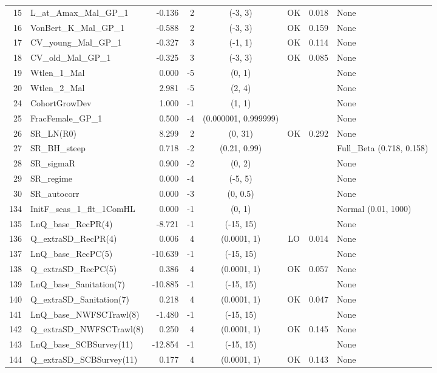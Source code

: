 \documentclass[12pt,]{article}
\begin{document}
\begin{landscape}
\begin{longtable}{rlrrcccl}
  15 & L\_at\_Amax\_Mal\_GP\_1 & -0.136 & 2 & (-3, 3) & OK & 0.018 & None \\ 
  16 & VonBert\_K\_Mal\_GP\_1 & -0.588 & 2 & (-3, 3) & OK & 0.159 & None \\ 
  17 & CV\_young\_Mal\_GP\_1 & -0.327 & 3 & (-1, 1) & OK & 0.114 & None \\ 
  18 & CV\_old\_Mal\_GP\_1 & -0.325 & 3 & (-3, 3) & OK & 0.085 & None \\ 
  19 & Wtlen\_1\_Mal & 0.000 & -5 & (0, 1) &  &  & None \\ 
  20 & Wtlen\_2\_Mal & 2.981 & -5 & (2, 4) &  &  & None \\ 
  24 & CohortGrowDev & 1.000 & -1 & (1, 1) &  &  & None \\ 
  25 & FracFemale\_GP\_1 & 0.500 & -4 & (0.000001, 0.999999) &  &  & None \\ 
  26 & SR\_LN(R0) & 8.299 & 2 & (0, 31) & OK & 0.292 & None \\ 
  27 & SR\_BH\_steep & 0.718 & -2 & (0.21, 0.99) &  &  & Full\_Beta (0.718, 0.158) \\ 
  28 & SR\_sigmaR & 0.900 & -2 & (0, 2) &  &  & None \\ 
  29 & SR\_regime & 0.000 & -4 & (-5, 5) &  &  & None \\ 
  30 & SR\_autocorr & 0.000 & -3 & (0, 0.5) &  &  & None \\ 
  134 & InitF\_seas\_1\_flt\_1ComHL & 0.000 & -1 & (0, 1) &  &  & Normal (0.01, 1000) \\ 
  135 & LnQ\_base\_RecPR(4) & -8.721 & -1 & (-15, 15) &  &  & None \\ 
  136 & Q\_extraSD\_RecPR(4) & 0.006 & 4 & (0.0001, 1) & LO & 0.014 & None \\ 
  137 & LnQ\_base\_RecPC(5) & -10.639 & -1 & (-15, 15) &  &  & None \\ 
  138 & Q\_extraSD\_RecPC(5) & 0.386 & 4 & (0.0001, 1) & OK & 0.057 & None \\ 
  139 & LnQ\_base\_Sanitation(7) & -10.885 & -1 & (-15, 15) &  &  & None \\ 
  140 & Q\_extraSD\_Sanitation(7) & 0.218 & 4 & (0.0001, 1) & OK & 0.047 & None \\ 
  141 & LnQ\_base\_NWFSCTrawl(8) & -1.480 & -1 & (-15, 15) &  &  & None \\ 
  142 & Q\_extraSD\_NWFSCTrawl(8) & 0.250 & 4 & (0.0001, 1) & OK & 0.145 & None \\ 
  143 & LnQ\_base\_SCBSurvey(11) & -12.854 & -1 & (-15, 15) &  &  & None \\ 
  144 & Q\_extraSD\_SCBSurvey(11) & 0.177 & 4 & (0.0001, 1) & OK & 0.143 & None \\ 

\end{longtable}
\end{landscape}
\end{document}
